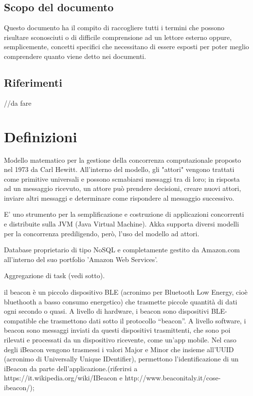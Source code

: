 \documentclass{scalatekids-article}
\begin{document}
\subsection{Scopo del documento}
Questo documento ha il compito di raccogliere tutti i termini che possono risultare sconosciuti o di difficile comprensione ad un lettore esterno oppure, semplicemente, concetti specifici che necessitano di essere esposti per poter meglio comprendere quanto viene detto nei documenti.
\subsection{Riferimenti} //da fare
\newpage
\section{Definizioni}


 Modello matematico per la gestione della concorrenza computazionale proposto nel 1973 da Carl Hewitt.
All'interno del modello, gli "attori" vengono trattati come primitive universali e possono scmabiarsi messaggi tra di loro; in risposta ad un messaggio ricevuto, un attore può prendere decisioni, creare nuovi attori, inviare altri messaggi e determinare come rispondere al messaggio successivo.

 E' uno strumento per la semplificazione e costruzione di applicazioni concorrenti e distribuite sulla JVM (Java Virtual Machine). Akka supporta diversi modelli per la concorrenza prediligendo, però, l'uso del modello ad attori.

 Database proprietario di tipo NoSQL e completamente gestito da Amazon.com all'interno del suo portfolio 'Amazon Web Services'.

 Aggregazione di task (vedi sotto). %


 il beacon è un piccolo dispositivo BLE (acronimo per Bluetooth Low Energy, cioè bluethooth a basso consumo energetico) che trasmette piccole quantità di dati ogni secondo o quasi.  A livello di hardware, i beacon sono dispositivi BLE-compatible che trasmettono dati sotto il protocollo “beacon”.
A livello software, i beacon sono messaggi inviati da questi dispositivi trasmittenti, che sono poi rilevati e processati da un dispositivo ricevente, come un’app mobile. Nel caso degli iBeacon vengono trasmessi i valori Major e Minor che insieme all’UUID (acronimo di Universally Unique IDentifier), permettono l’identificazione di un iBeacon da parte dell’applicazione.(riferirsi a https://it.wikipedia.org/wiki/IBeacon e http://www.beaconitaly.it/cose-ibeacon/);
\end{document}
